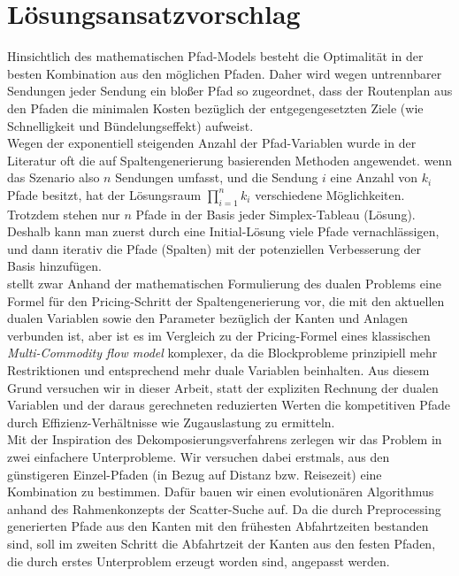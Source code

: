 \chapter{Lösungsansatzvorschlag}
Hinsichtlich des mathematischen Pfad-Models besteht die Optimalität in der besten Kombination aus den möglichen Pfaden. Daher wird wegen untrennbarer Sendungen jeder Sendung ein bloßer Pfad so zugeordnet, dass der Routenplan aus den Pfaden die minimalen Kosten bezüglich der entgegengesetzten Ziele (wie Schnelligkeit und Bündelungseffekt) aufweist.\\
Wegen der exponentiell steigenden Anzahl der Pfad-Variablen wurde in der Literatur oft die auf Spaltengenerierung basierenden Methoden angewendet. wenn das Szenario also \(n\) Sendungen umfasst, und die Sendung \(i\) eine Anzahl von \(k_i\) Pfade besitzt, hat der Lösungsraum $\prod\limits_{i=1}^n k_{i}$ verschiedene Möglichkeiten. Trotzdem stehen nur \(n\) Pfade in der Basis jeder Simplex-Tableau (Lösung). Deshalb kann man zuerst durch eine Initial-Lösung viele Pfade vernachlässigen, und dann iterativ die Pfade (Spalten) mit der potenziellen Verbesserung der Basis hinzufügen.\\
\cite{homfeld2012consolidating} stellt zwar Anhand der mathematischen Formulierung des dualen Problems eine Formel für den Pricing-Schritt der Spaltengenerierung vor, die mit den aktuellen dualen Variablen sowie den Parameter bezüglich der Kanten und Anlagen verbunden ist, aber ist es im Vergleich zu der Pricing-Formel eines klassischen \emph{Multi-Commodity flow model} komplexer, da die Blockprobleme prinzipiell mehr Restriktionen und entsprechend mehr duale Variablen beinhalten. Aus diesem Grund versuchen wir in dieser Arbeit, statt der expliziten Rechnung der dualen Variablen und der daraus gerechneten reduzierten Werten die kompetitiven Pfade durch Effizienz-Verhältnisse wie Zugauslastung zu ermitteln.\\
Mit der Inspiration des Dekomposierungsverfahrens zerlegen wir das Problem in zwei einfachere Unterprobleme. Wir versuchen dabei erstmals, aus den günstigeren Einzel-Pfaden (in Bezug auf Distanz bzw. Reisezeit) eine Kombination zu bestimmen. Dafür bauen wir einen evolutionären Algorithmus anhand des Rahmenkonzepts der Scatter-Suche auf. Da die durch Preprocessing generierten Pfade aus den Kanten mit den frühesten Abfahrtzeiten bestanden sind, soll im zweiten Schritt die Abfahrtzeit der Kanten aus den festen Pfaden, die durch erstes Unterproblem erzeugt worden sind, angepasst werden. \\

